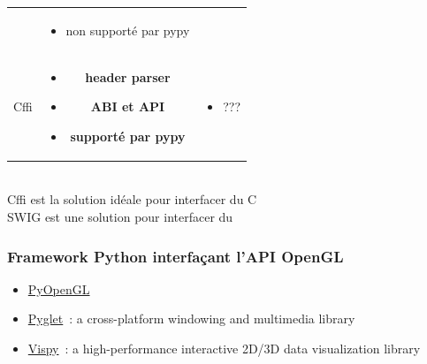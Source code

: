 \begin{frame}
\begin{center}
\begin{tabular}{ccc}
\begin{minipage}[t]{.2\linewidth}
\begin{itemize}
        \end{itemize}
      \end{minipage} &
      \begin{minipage}[t]{.45\linewidth}
        \tiny
        \begin{itemize}
          \item non supporté par pypy
        \end{itemize}
      \end{minipage} \\[1em]
      Cffi &
      \begin{minipage}[t]{.2\linewidth}
        \tiny
        \begin{itemize}
        \item \textbf{header parser}
        \item \textbf{ABI et API}
        \item \textbf{supporté par pypy}
        \end{itemize}
      \end{minipage} &
      \begin{minipage}[t]{.45\linewidth}
        \tiny
        \begin{itemize}
        \item ???
        \end{itemize}
      \end{minipage}
    \end{tabular} \\[1em]
    \alert{Cffi est la solution idéale pour interfacer du C} \\[.5em]
    \alert{SWIG est une solution pour interfacer du \Cpp}
  \end{center}
\end{frame}

\begin{frame}
  \frametitle{Framework Python interfaçant l'API OpenGL}
  \begin{itemize}
    \item \href{http://pyopengl.sourceforge.net}{PyOpenGL}
    \item \href{http://www.pyglet.org}{Pyglet}~: a cross-platform windowing and multimedia library
    \item \href{http://vispy.org}{Vispy}~: a high-performance interactive 2D/3D data visualization library
  \end{itemize}
\end{frame}

